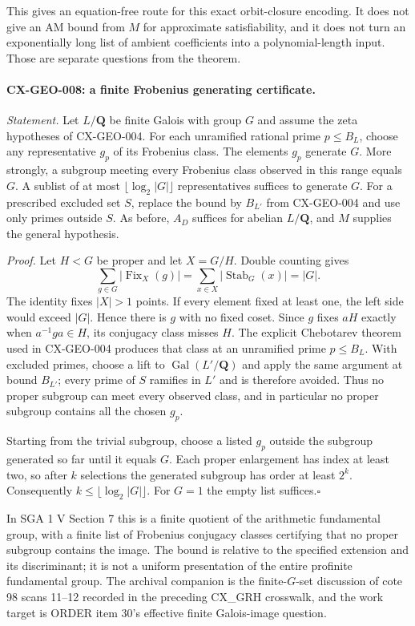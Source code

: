\documentclass[11pt,a4paper]{article}
\begin{document}
This gives an equation-free route for this exact orbit-closure encoding.
It does not give an AM bound from $M$ for approximate satisfiability, and
it does not turn an exponentially long list of ambient coefficients into
a polynomial-length input. Those are separate questions from the theorem.

\paragraph{CX-GEO-008: a finite Frobenius generating certificate.}
\emph{Statement.} Let $L/\mathbf Q$ be finite Galois with group $G$ and
assume the zeta hypotheses of CX-GEO-004. For each unramified rational
prime $p\leq B_L$, choose any representative $g_p$ of its Frobenius class.
The elements $g_p$ generate $G$. More strongly, a subgroup meeting every
Frobenius class observed in this range equals $G$. A sublist of at most
$\lfloor\log_2|G|\rfloor$ representatives suffices to generate $G$.
For a prescribed excluded set $S$, replace the bound by $B_{L'}$ from
CX-GEO-004 and use only primes outside $S$. As before, $A_D$ suffices for
abelian $L/\mathbf Q$, and $M$ supplies the general hypothesis.

\emph{Proof.} Let $H<G$ be proper and let $X=G/H$. Double counting gives
\[
 \sum_{g\in G}|\operatorname{Fix}_X(g)|
      =\sum_{x\in X}|\operatorname{Stab}_G(x)|=|G|.
\]
The identity fixes $|X|>1$ points. If every element fixed at least one,
the left side would exceed $|G|$. Hence there is $g$ with no fixed coset.
Since $g$ fixes $aH$ exactly when $a^{-1}ga\in H$, its conjugacy class
misses $H$. The explicit Chebotarev theorem used in CX-GEO-004 produces
that class at an unramified prime $p\leq B_L$. With excluded primes,
choose a lift to $\operatorname{Gal}(L'/\mathbf Q)$ and apply the same
argument at bound $B_{L'}$; every prime of $S$ ramifies in $L'$ and is
therefore avoided. Thus no proper subgroup can meet every observed class,
and in particular no proper subgroup contains all the chosen $g_p$.

Starting from the trivial subgroup, choose a listed $g_p$ outside the
subgroup generated so far until it equals $G$. Each proper enlargement
has index at least two, so after $k$ selections the generated subgroup has
order at least $2^k$. Consequently $k\leq\lfloor\log_2|G|\rfloor$.
For $G=1$ the empty list suffices.\hfill$\square$

In SGA 1 V Section 7 this is a finite quotient of the arithmetic
fundamental group, with a finite list of Frobenius conjugacy classes
certifying that no proper subgroup contains the image. The bound is
relative to the specified extension and its discriminant; it is not a
uniform presentation of the entire profinite fundamental group. The
archival companion is the finite-$G$-set discussion of cote 98 scans
11--12 recorded in the preceding CX\_GRH crosswalk, and the work target
is ORDER item 30's effective finite Galois-image question.
\end{document}
